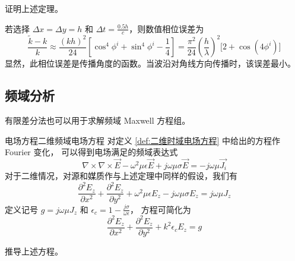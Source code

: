 \begin{exercise}
    证明上述定理。
\end{exercise}

\begin{example}
    若选择 $\Delta x=\Delta y = h$ 和 $\Delta t = \frac{0.5h}{c}$，则数值相位误差为
    \begin{equation*}
        \frac{\tilde{k}-k}{k}
        \approx\frac{(kh)^2}{24}
        \left[\cos^4\phi^i+\sin^4\phi^i-\frac{1}{4}\right]
        =\frac{\pi^2}{24}\left(\frac{h}{\lambda}\right)^2\Big[2+\cos(4\phi^i)\Big]
    \end{equation*}
    显然，此相位误差是传播角度的函数。当波沿对角线方向传播时，该误差最小。
\end{example}

\subsection{频域分析}

\par 有限差分法也可以用于求解频域 Maxwell 方程组。

\begin{definition}{电场方程}{二维频域电场方程}
    对定义 \ref{def:二维时域电场方程} 中给出的方程作 Fourier 变化，
    可以得到电场满足的频域表达式
    \begin{equation}
        \nabla \times \nabla \times \vec{E}
        -\omega^2\mu \epsilon  \vec{E}
        +j\omega \mu \sigma \vec{E}
        =-j\omega\mu \vec{J_i}
    \end{equation}
    对于二维情况，对源和媒质作与上述定理中同样的假设，我们有
    \begin{equation}
        \frac{\partial^2 E_z}{\partial x^2}
        +\frac{\partial^2 E_z}{\partial y^2}
        +\omega^2\mu \epsilon  E_z
        -j\omega \mu \sigma E_z
        =j\omega\mu J_z
        \label{二维频域电场方程}
    \end{equation}
    定义记号 $g=j\omega \mu J_z$ 和 $\epsilon_c=1-\frac{j\sigma}{\omega \epsilon}$，
    方程可简化为
    \begin{equation}
        \frac{\partial^2 E_z}{\partial x^2}
        +\frac{\partial^2 E_z}{\partial y^2}
        +k^2\epsilon_c  E_z
        =g
    \end{equation}
\end{definition}

\begin{exercise}
    推导上述方程。
\end{exercise}

